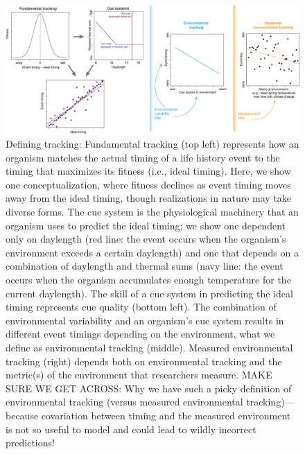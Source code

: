\documentclass[11pt,letterpaper]{article}
\begin{document}
\begin{figure}[h!]
\centering
\includegraphics[width=1\textwidth]{..//..//..//R/graphs/conceptual/envtracking_define.png}
\caption{Defining tracking: Fundamental tracking (top left) represents how an organism matches the actual timing of a life history event to the timing that maximizes its fitness (i.e., ideal timing). Here, we show one conceptualization, where fitness declines as event timing moves away from the ideal timing, though realizations in nature may take diverse forms. The cue system is the physiological machinery that an organism uses to predict the ideal timing; we show one dependent only on daylength (red line: the event occurs when the organism's environment exceeds a certain daylength) and one that depends on a combination of daylength and thermal sums (navy line: the event occurs when the organism accumulates enough temperature for the current daylength). The skill of a cue system in predicting the ideal timing represents cue quality (bottom left). The combination of  environmental variability and an organism's cue system results in different event timings depending on the environment, what we define as environmental tracking (middle). Measured environmental tracking (right) depends both on environmental tracking and the metric(s) of the environment that researchers measure. MAKE SURE WE GET ACROSS: Why we have such a picky definition of environmental tracking (versus measured environmental tracking)---because covariation between timing and the measured environment is not so useful to model and could lead to wildly incorrect predictions!} 
 \label{fig:defineET}
\end{figure}
\end{document}

